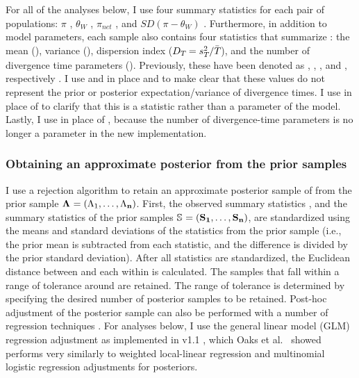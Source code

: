 For all of the analyses below, I use four summary statistics for each pair of
populations:
$\pi$ \cite{Tajima1983}, $\theta_W$ \cite{Watterson1975}, $\pi_{net}$
\cite{Takahata1985}, and $SD(\pi-\theta_W)$ \cite{Tajima1989}.
Furthermore, in addition to model parameters, each sample \hpvector{}
also contains four statistics that summarize \divTimeMapVector:
the mean (\divTimeMean), variance (\divTimeVar), dispersion index
($D_{T_{}} = s^{2}_{T_{}}/\bar{T_{}}$), and the number
of divergence time parameters (\divTimeNum).
Previously, these have been denoted as \meant{}{}, \vart{}{}, \vmratio{}, and
\numt{}, respectively \cite{Hickerson2006,Huang2011,Oaks2012}.
I use \divTimeMean and \divTimeVar in place \meant{}{} and \vart{}{} to make
clear that these values do not represent the prior or posterior
expectation/variance of divergence times.
I use \divTimeDispersion in place of \vmratio{} to clarify that this is a
statistic rather than a parameter of the model.
Lastly, I use \divTimeNum in place of \numt{}, because the number of
divergence-time parameters is no longer a parameter in the new implementation.


\subsubsection{Obtaining an approximate posterior from the prior samples}
I use a rejection algorithm to retain an approximate posterior sample of
\paramSampleVector{} from the prior sample
$\boldsymbol{\Lambda_{}} = (\Lambda_{1}, \ldots, \Lambda_{\mathbf{n}})$.
First, the observed summary statistics \ssVectorObs, and the summary statistics
of the prior samples 
$\ssMatrix = (\ssVector{1}, \ldots, \ssVector{\numPriorSamples})$,
are standardized using the means and standard deviations of the statistics from
the prior sample (i.e., the prior mean is subtracted from each statistic, and the
difference is divided by the prior standard deviation).
After all statistics are standardized, the Euclidean distance between
\ssVectorObs and each \ssVector{} within \ssMatrix is calculated.
The samples that fall within a range of tolerance \tol around \ssVectorObs
are retained.
The range of tolerance is determined by specifying the desired number of
posterior samples to be retained.
Post-hoc adjustment of the posterior sample can also be performed with a number
of regression techniques \cite{Beaumont2002,Blum2009,Leuenberger2010}.
For analyses below, I use the general linear model (GLM) regression adjustment
\cite{Leuenberger2010} as implemented in \abctoolbox v1.1
\cite{ABCtoolbox}, which Oaks et al.\ \cite{Oaks2012} showed performs
very similarly to weighted local-linear regression and multinomial logistic
regression adjustments \cite{Beaumont2002} for \msb posteriors.


